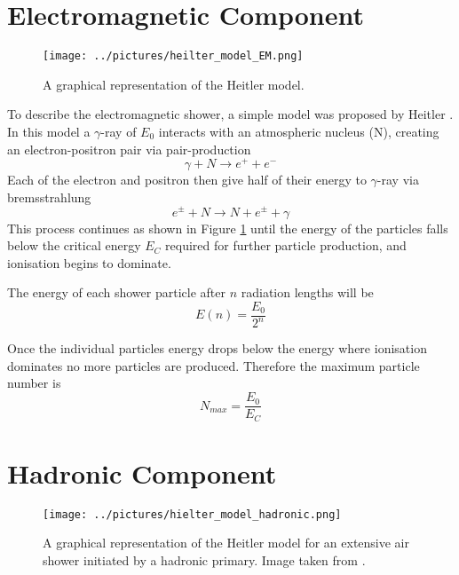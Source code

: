 \section{Electromagnetic Component}

\begin{figure}[htp]
\texttt{[image: ../pictures/heilter\_model\_EM.png]}
\caption{A graphical representation of the Heitler model.}\label{fig:heitler_model}
\end{figure}

To describe the electromagnetic shower, a simple model was proposed by Heitler \cite{Heitler}. In this model a $\gamma$-ray of $E_0$ interacts with an atmospheric nucleus (N), creating an electron-positron pair via pair-production
\begin{equation}
\gamma + N \rightarrow e^+ + e^- 
\end{equation}
Each of the electron and positron then give half of their energy to $\gamma$-ray via bremsstrahlung
\begin{equation}
e^{\pm} + N \rightarrow N + e^{\pm} + \gamma
\end{equation}
This process continues as shown in Figure \ref{fig:heitler_model} until the energy of the particles falls below the critical energy $E_C$ required for further particle production, and ionisation begins to dominate.

The energy of each shower particle after $n$ radiation lengths will be
\begin{equation}
E(n) = \frac{E_0}{2^n}
\end{equation}

Once the individual particles energy drops below the energy where ionisation dominates no more particles are produced. Therefore the maximum particle number is
\begin{equation}
N_{max} = \frac{E_0}{E_C}
\end{equation}

\section{Hadronic Component}

\begin{figure}[htbp]
\texttt{[image: ../pictures/hielter\_model\_hadronic.png]}
\caption{A graphical representation of the Heitler model for an extensive air shower initiated by a hadronic primary. Image taken from \cite{0034-4885-66-7-202}.}
\end{figure}


